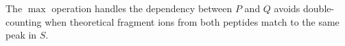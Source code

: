 \documentclass[arial,11pt]{article}
\begin{document}
The $\max$ operation handles the dependency between $P$ and $Q$ avoids double-counting when theoretical fragment ions from both peptides match to the same peak in $S$.

%
%
\end{document}
